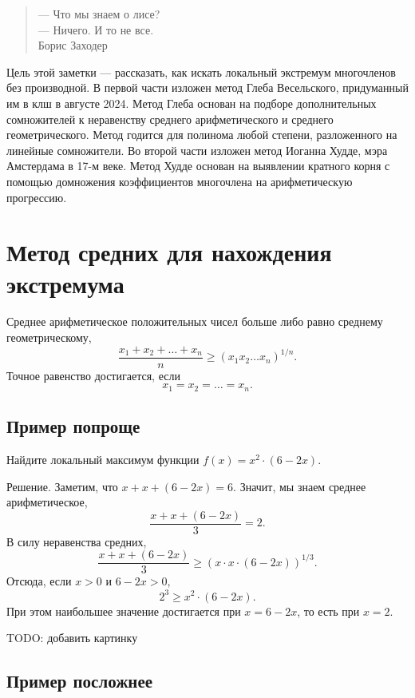 \documentclass[12pt]{article}
\begin{document}
\begin{verse}
    \begin{flushright}
        — Что мы знаем о лисе? \\
        — Ничего. И то не все. \\

        Борис Заходер
    \end{flushright}
\end{verse}

Цель этой заметки — рассказать, как искать локальный экстремум многочленов без производной.
В первой части изложен метод Глеба Весельского, придуманный им в клш в августе 2024.
Метод Глеба основан на подборе дополнительных сомножителей к неравенству среднего арифметического и среднего геометрического.
Метод годится для полинома любой степени, разложенного на линейные сомножители.
Во второй части изложен метод Иоганна Худде, мэра Амстердама в 17-м веке. 
Метод Худде основан на выявлении кратного корня с помощью  домножения коэффициентов многочлена на арифметическую прогрессию.


\section{Метод средних для нахождения экстремума}

\begin{tcolorbox}[colback=yellow!50!red!25!white]
Среднее арифметическое положительных чисел больше либо равно среднему геометрическому,
\[
\frac{x_1 + x_2 + \dots + x_n}{n} \geq (x_1 x_2 \dots x_n)^{1/n}.
\]
Точное равенство достигается, если
\[
x_1 = x_2 = \dots = x_n.
\]
\end{tcolorbox}

\subsection*{Пример попроще}

Найдите локальный максимум функции $f(x) = x^2 \cdot (6 - 2x)$.


Решение. Заметим, что $x + x + (6 - 2x) = 6$.
Значит, мы знаем среднее арифметическое,
\[
\frac{x + x + (6- 2x)}{3} = 2.
\]
В силу неравенства средних,
\[
\frac{x + x + (6- 2x)}{3} \geq (x\cdot x \cdot (6 - 2x))^{1/3}.
\]
Отсюда, если $x > 0$ и $6 - 2x>0$, 
\[
2^3 \geq x^2 \cdot (6 - 2x).
\]
При этом наибольшее значение достигается при $x = 6 - 2x$, то есть при $x=2$.


TODO: добавить картинку


\subsection*{Пример посложнее}
\end{document}
